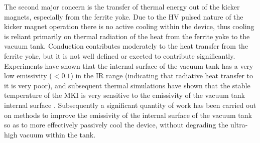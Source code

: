 The second major concern is the transfer of thermal energy out of the kicker magnets, especially from the ferrite yoke. Due to the HV pulsed nature of the kicker magnet operation there is no active cooling within the device, thus cooling is reliant primarily on thermal radiation of the heat from the ferrite yoke to the vacuum tank. Conduction contributes moderately to the heat transfer from the ferrite yoke, but it is not well defined or exected to contribute significantly. Experiments have shown that the internal surface of the vacuum tank has a very low emissivity ($< 0.1$) in the IR range \cite{Barnes:emisMKI}(indicating that radiative heat transfer to it is very poor), and subsequent thermal simulations have shown that the stable temperature of the MKI is very sensitive to the emissivity of the vacuum tank internal surface \cite{Garlasche:2dHeatEmis}. Subsequently a significant quantity of work has been carried out on methods to improve the emissivity of the internal surface of the vacuum tank so as to more effectively passively cool the device, without degrading the ultra-high vacuum within the tank.